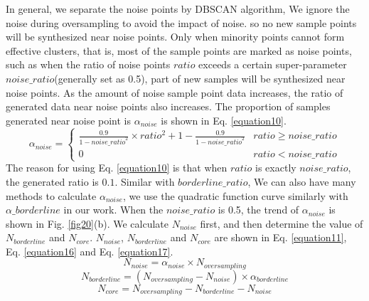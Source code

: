 \documentclass[runningheads]{llncs}
\begin{document}
In general, 
we separate the noise points by DBSCAN algorithm,
We ignore the noise during oversampling to avoid the impact of noise.
so no new sample points will be synthesized near noise points.
Only when minority points cannot form effective clusters, that is,
most of the sample points are marked as noise points, 
such as when the ratio of noise points $ratio$ exceeds a certain 
super-parameter $noise\_ratio$(generally set as 0.5),
part of new samples will be synthesized near noise points.
As the amount of noise sample point data increases, 
the ratio of generated data near noise points also increases. 
The proportion of samples generated near noise point
 is $\alpha_{noise}$ is shown in Eq. \ref{equation10}.
\begin{equation}
  \label{equation10}
  \alpha_{noise}=
  \begin{cases}
  \frac{0.9}{1-{noise\_{ratio}}^2}\times ratio^2+1-\frac{0.9}{1-{noise\_ratio}^2} & ratio \ge noise\_ratio\\
  0                                                                               & ratio < noise\_ratio
  \end{cases}
\end{equation}
The reason for using Eq. \ref{equation10} is that when $ratio$ is exactly
$noise\_ratio$, the generated ratio is $0.1$. Similar with $borderline\_ratio$,
We can also have many methods to calculate $\alpha_{noise}$,
we use the quadratic function curve similarly with $\alpha\_borderline$ in our work.
When the $noise\_ratio$ is 0.5, the trend of $\alpha_{noise}$ is shown in Fig. \ref{fig20}(b).
We calculate $N_{noise}$ first, and then determine the value of $N_{borderline}$ and $N_{core}$.
$N_{noise}$, $N_{borderline}$ 
and $N_{core}$ are shown in Eq. \ref{equation11}, Eq. \ref{equation16}
and Eq. \ref{equation17}.
\begin{equation}
  \label{equation11}
  N_{noise}=\alpha_{noise} \times N_{oversampling}
\end{equation}
\begin{equation}
  \label{equation16}
  N_{borderline}=(N_{oversampling}-N_{noise})\times \alpha_{borderline}
\end{equation}
\begin{equation}
  \label{equation17}
  N_{core}=N_{oversampling}-N_{borderline}-N_{noise}
\end{equation}
\end{document}
